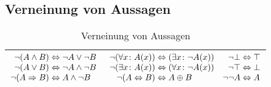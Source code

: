 \subsection{Verneinung von Aussagen}

\begin{table}
\begin{center}
\caption{Verneinung von Aussagen}%
\label{tab:Verneinung-von-Aussagen}
\begin{tabular}{l}
\toprule
$\begin{array}{@{}r@{\;}l@{\quad\;\;}r@{\;}lr@{\;}l@{}}
\lnot(A\land B) &\bicond\lnot A\lor\lnot B
& \lnot(\forall x\colon A(x)) &\bicond (\exists x\colon\lnot A(x))
& \lnot\bot &\bicond\top\\
\lnot(A\lor B) &\bicond\lnot A\land\lnot B
& \lnot(\exists x\colon A(x)) &\bicond (\forall x\colon\lnot A(x))
& \lnot\top &\bicond\bot\\
\lnot (A\cond B) &\bicond A\land \lnot B
& \lnot (A\bicond B) &\bicond A\oplus B
& \lnot\lnot A &\bicond A
\end{array}$\\
\bottomrule
\end{tabular}
\end{center}
\end{table}

